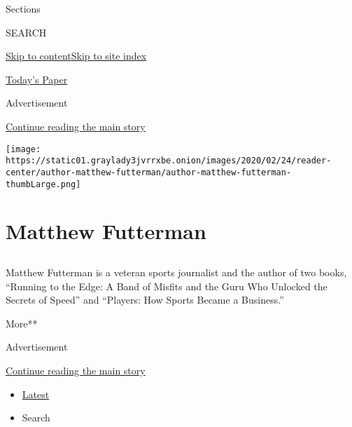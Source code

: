 Sections

SEARCH

\protect\hyperlink{site-content}{Skip to
content}\protect\hyperlink{site-index}{Skip to site index}

\href{https://myaccount.nytimes3xbfgragh.onion/auth/login?response_type=cookie\&client_id=vi}{}

\href{https://www.nytimes3xbfgragh.onion/section/todayspaper}{Today's
Paper}

Advertisement

\protect\hyperlink{after-top}{Continue reading the main story}

\texttt{[image: https://static01.graylady3jvrrxbe.onion/images/2020/02/24/reader-center/author-matthew-futterman/author-matthew-futterman-thumbLarge.png]}

\hypertarget{matthew-futterman}{%
\section{Matthew Futterman}\label{matthew-futterman}}

\subsection{}

Matthew Futterman is a veteran sports journalist and the author of two
books, ``Running to the Edge: A Band of Misfits and the Guru Who
Unlocked the Secrets of Speed'' and ``Players: How Sports Became a
Business.''

More**

Advertisement

\protect\hyperlink{after-mid1}{Continue reading the main story}

\begin{itemize}
\tightlist
\item
  \protect\hyperlink{stream-panel}{Latest}
\item
  Search
\end{itemize}

